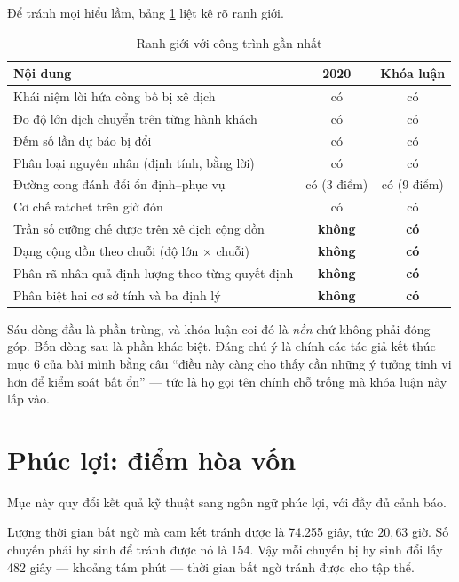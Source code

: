 Để tránh mọi hiểu lầm, bảng \ref{bang:trung} liệt kê rõ ranh giới.

\begin{table}[htbp]
\centering
\caption{Ranh giới với công trình gần nhất}
\label{bang:trung}
\small
\begin{tabular}{@{}p{7.2cm}cc@{}}
\toprule
\textbf{Nội dung} & \textbf{2020} & \textbf{Khóa luận}\\
\midrule
Khái niệm lời hứa công bố bị xê dịch & có & có\\
Đo độ lớn dịch chuyển trên từng hành khách & có & có\\
Đếm số lần dự báo bị đổi & có & có\\
Phân loại nguyên nhân (định tính, bằng lời) & có & có\\
Đường cong đánh đổi ổn định--phục vụ & có (3 điểm) & có (9 điểm)\\
Cơ chế ratchet trên giờ đón & có & có\\
\midrule
Trần số cưỡng chế được trên xê dịch cộng dồn & \textbf{không} & \textbf{có}\\
Dạng cộng dồn theo chuỗi (độ lớn $\times$ chuỗi) & \textbf{không} & \textbf{có}\\
Phân rã nhân quả định lượng theo từng quyết định & \textbf{không} & \textbf{có}\\
Phân biệt hai cơ sở tính và ba định lý & \textbf{không} & \textbf{có}\\
\bottomrule
\end{tabular}
\end{table}

Sáu dòng đầu là phần trùng, và khóa luận coi đó là \emph{nền} chứ không phải đóng góp. Bốn dòng
sau là phần khác biệt. Đáng chú ý là chính các tác giả kết thúc mục 6 của bài mình bằng câu
``điều này càng cho thấy cần những ý tưởng tinh vi hơn để kiểm soát bất ổn'' --- tức là họ gọi
tên chính chỗ trống mà khóa luận này lấp vào.

\section{Phúc lợi: điểm hòa vốn}
\label{muc:phucloi}

Mục này quy đổi kết quả kỹ thuật sang ngôn ngữ phúc lợi, với đầy đủ cảnh báo.

Lượng thời gian bất ngờ mà cam kết tránh được là 74.255 giây, tức $20{,}63$ giờ. Số chuyến phải
hy sinh để tránh được nó là 154. Vậy mỗi chuyến bị hy sinh đổi lấy 482 giây --- khoảng tám phút
--- thời gian bất ngờ tránh được cho tập thể.

